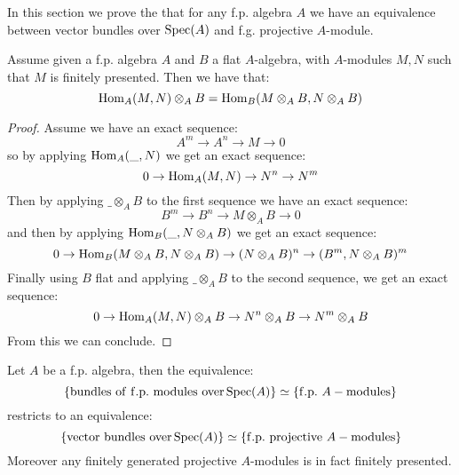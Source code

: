 In this section we prove the that for any f.p. algebra $A$ we have an equivalence between vector bundles over $\operatorname{Spec}(A)$ and f.g. projective $A$-module.

\begin{lemma}\label{localisation-hom}
Assume given a f.p. algebra $A$ and $B$ a flat $A$-algebra, with $A$-modules $M,N$ such that $M$ is finitely presented. Then we have that:
\[ \mathrm{Hom}_A(M,N) \otimes_AB = \mathrm{Hom}_B(M\otimes_AB,N\otimes_AB) \] 
\end{lemma}

\begin{proof}
Assume we have an exact sequence:
\[A^m\to A^n\to M\to 0\]
so by applying $\mathrm{Hom}_A(\_,N)$ we get an exact sequence:
\[0\to \mathrm{Hom}_A(M,N) \to N^n \to N^m\]
Then by applying $\_\otimes_AB$ to the first sequence we have an exact sequence:
\[B^m\to B^n\to M\otimes_AB\to 0\]
and then by applying $\mathrm{Hom}_B(\_,N\otimes_AB)$ we get an exact sequence:
\[0\to \mathrm{Hom}_B(M\otimes_AB,N\otimes_AB) \to (N\otimes_AB)^n \to (B^m,N\otimes_AB)^m\]
Finally using $B$ flat and applying $\_\otimes_AB$ to the second sequence, we get an exact sequence:
\[0\to \mathrm{Hom}_A(M,N)\otimes_AB \to N^n \otimes_AB \to N^m\otimes_AB\]
From this we can conclude.
\end{proof}

\begin{proposition}
Let $A$ be a f.p. algebra, then the equivalence:
\[\{\mathrm{bundles\ of\ f.p.\ modules\ over} \operatorname{Spec}(A)\} \simeq \{\mathrm{f.p.}\ A-\mathrm{modules}\}\] 
restricts to an equivalence:
\[\{\mathrm{vector\ bundles\ over} \operatorname{Spec}(A)\} \simeq \{\mathrm{f.p.\ projective}\ A-\mathrm{modules}\}\] 
Moreover any finitely generated projective $A$-modules is in fact finitely presented.
\end{proposition}

